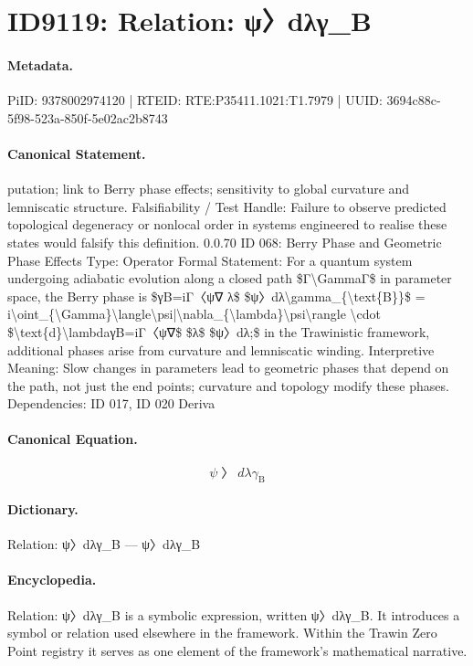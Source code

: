 \section*{ID9119: Relation: ψ〉dλγ\_B}
\paragraph{Metadata.}
PiID: 9378002974120 | RTEID: RTE:P35411.1021:T1.7979 | UUID: 3694c88c-5f98-523a-850f-5e02ac2b8743

\paragraph{Canonical Statement.}
putation; link to Berry phase effects; sensitivity to global curvature and lemniscatic structure. Falsifiability / Test Handle: Failure to observe predicted topological degeneracy or nonlocal order in systems engineered to realise these states would falsify this definition. 0.0.70 ID 068: Berry Phase and Geometric Phase Effects Type: Operator Formal Statement: For a quantum system undergoing adiabatic evolution along a closed path \$Γ\textbackslash{}GammaΓ\$ in parameter space, the Berry phase is \$γB=iΓ〈ψ∇ λ\$ \$ψ〉dλ\textbackslash{}gamma\_\{\textbackslash{}text\{B\}\}\$ = i\textbackslash{}oint\_\{\textbackslash{}Gamma\}\textbackslash{}langle\textbackslash{}psi|\textbackslash{}nabla\_\{\textbackslash{}lambda\}\textbackslash{}psi\textbackslash{}rangle \textbackslash{}cdot \$\textbackslash{}text\{d\}\textbackslash{}lambdaγB=iΓ〈ψ∇\$ \$λ\$ \$ψ〉dλ;\$ in the Trawinistic framework, additional phases arise from curvature and lemniscatic winding. Interpretive Meaning: Slow changes in parameters lead to geometric phases that depend on the path, not just the end points; curvature and topology modify these phases. Dependencies: ID 017, ID 020 Deriva

\paragraph{Canonical Equation.}
\[
ψ〉dλ\gamma_{\text{B}}
\]

\paragraph{Dictionary.}
Relation: ψ〉dλγ\_B — ψ〉dλγ\_B

\paragraph{Encyclopedia.}
Relation: ψ〉dλγ\_B is a symbolic expression, written ψ〉dλγ\_B. It introduces a symbol or relation used elsewhere in the framework. Within the Trawin Zero Point registry it serves as one element of the framework's mathematical narrative.
